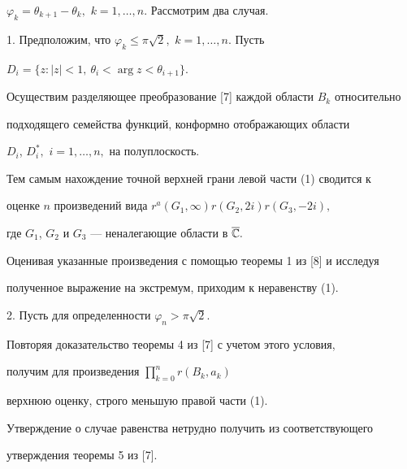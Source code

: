 $\varphi_k=\theta_{k+1}-\theta_k,$ $k=1,\dotsc,n.$ Рассмотрим два случая.





1. Предположим, что $\varphi_k\le \pi\sqrt{2},$ $k=1,\dotsc,n.$ Пусть


$D_i=\{z:|z|<1,\ \theta_i<\arg z<\theta_{i+1}\}.$


Осуществим разделяющее преобразование [7] каждой области $B_k$ относительно


подходящего семейства функций, конформно отображающих области


$D_i$, $D_i^*,$ $i=1,\dotsc,n,$ на полуплоскость.


Тем самым нахождение точной верхней грани левой части (1) сводится к


оценке $n$ произведений вида $r^{a}(G_1,\infty)r(G_2,2i)r(G_3,-2i),$


где $G_1$, $G_2$ и $G_3$ --- неналегающие области в $\overline{\Bbb C}.$


Оценивая указанные произведения с помощью теоремы 1 из [8] и исследуя


полученное выражение на экстремум, приходим к неравенству (1).





2. Пусть для определенности $\varphi_n>\pi\sqrt{2}.$


Повторяя доказательство теоремы 4 из [7] с учетом этого условия,


получим для произведения $\prod\limits_{k=0}^n r(B_k,a_k)$


верхнюю оценку, строго меньшую правой части (1).





Утверждение о случае равенства нетрудно получить из соответствующего


утверждения теоремы 5 из [7].





